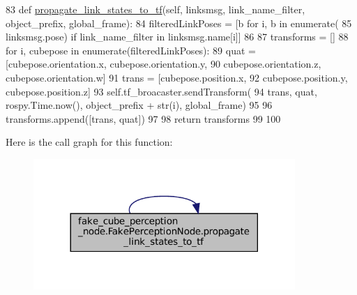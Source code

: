 \begin{DoxyCode}
83     \textcolor{keyword}{def }\hyperlink{classfake__cube__perception__node_1_1FakePerceptionNode_aeac788f768e625ecbe445c6af105d3f8}{propagate\_link\_states\_to\_tf}(self, linksmsg,  link\_name\_filter, 
      object\_prefix, global\_frame):
84         filteredLinkPoses = [b \textcolor{keywordflow}{for} i, b \textcolor{keywordflow}{in} enumerate(
85             linksmsg.pose) \textcolor{keywordflow}{if} link\_name\_filter \textcolor{keywordflow}{in} linksmsg.name[i]]
86 
87         transforms = []
88         \textcolor{keywordflow}{for} i, cubepose \textcolor{keywordflow}{in} enumerate(filteredLinkPoses):
89             quat = [cubepose.orientation.x, cubepose.orientation.y,
90                     cubepose.orientation.z, cubepose.orientation.w]
91             trans = [cubepose.position.x,
92                      cubepose.position.y, cubepose.position.z]
93             self.tf\_broacaster.sendTransform(
94                 trans, quat, rospy.Time.now(), object\_prefix + str(i), global\_frame)
95 
96             transforms.append([trans, quat])
97 
98         \textcolor{keywordflow}{return} transforms
99 
100 
\end{DoxyCode}
Here is the call graph for this function\+:
\nopagebreak
\begin{figure}[H]
\begin{center}
\leavevmode
\includegraphics[width=281pt]{classfake__cube__perception__node_1_1FakePerceptionNode_aeac788f768e625ecbe445c6af105d3f8_cgraph}
\end{center}
\end{figure}
\mbox{\label{classfake__cube__perception__node_1_1FakePerceptionNode_aeac788f768e625ecbe445c6af105d3f8}} 
